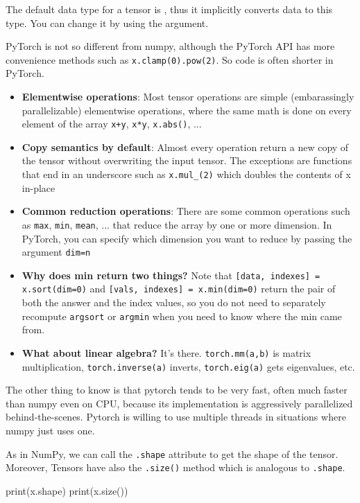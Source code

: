 \begin{observationblock}
    The default data type for a tensor is , thus it implicitly converts data to this type. You can change it by using the  argument.
\end{observationblock}

PyTorch is not so different from numpy, although the PyTorch API has more convenience methods such as \texttt{x.clamp(0).pow(2)}. So code is often shorter in PyTorch. 

\begin{itemize}
    \item \textbf{Elementwise operations}: Most tensor operations are simple (embarassingly parallelizable) elementwise operations, where the same math is done on every element of the array \texttt{x+y}, \texttt{x*y}, \texttt{x.abs()}, ... 
    \item \textbf{Copy semantics by default}: Almost every operation return a new copy of the tensor without overwriting the input tensor. The exceptions are functions that end in an underscore such as \texttt{x.mul\_(2)} which doubles the contents of x in-place
    \item \textbf{Common reduction operations}: There are some common operations such as \texttt{max}, \texttt{min}, \texttt{mean}, ... that reduce the array by one or more dimension. In PyTorch, you can specify which dimension you want to reduce by passing the argument \texttt{dim=n}
    \item \textbf{Why does min return two things?} Note that \texttt{[data, indexes] = x.sort(dim=0)} and \texttt{[vals, indexes] = x.min(dim=0)} return the pair of both the answer and the index values, so you do not need to separately recompute \texttt{argsort} or \texttt{argmin} when you need to know where the min came from.
    \item \textbf{What about linear algebra?} It's there. \texttt{torch.mm(a,b)} is matrix multiplication, \texttt{torch.inverse(a)} inverts, \texttt{torch.eig(a)} gets eigenvalues, etc. 
\end{itemize}

The other thing to know is that pytorch tends to be very fast, often much faster than numpy even on CPU, because its implementation is aggressively parallelized behind-the-scenes.  Pytorch is willing to use multiple threads in situations where numpy just uses one.

As in NumPy, we can call the \texttt{.shape} attribute to get the shape of the tensor. Moreover, Tensors have also the \texttt{.size()} method which is analogous to \texttt{.shape}.
\begin{codeblock}[language=python]
print(x.shape)
print(x.size())
\end{codeblock}

